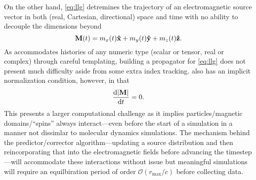 On the other hand, \cref{eq:llg} detremines the trajectory of an electromagnetic source vector in both (real, Cartesian, directional) space and time with no ability to decouple the dimensions beyond
\begin{equation}
  \vb{M}(t) = m_x(t) \vu{x} + m_y(t) \vu{y} + m_z(t) \vu{z}.
\end{equation}
As \QuEST{} accommodates histories of any numeric type (scalar or tensor, real or complex) through careful templating, building a propagator for \cref{eq:llg} does not present much difficulty aside from some extra index tracking.
 also has an implicit normalization condition, however, in that
\begin{equation}
  \dv{\abs{\vb{M}}}{t} = 0.
\end{equation}
This presents a larger computational challenge as it implies particles/magnetic domains/``spins'' always interact---even before the start of a simulation in a manner not dissimlar to molecular dynamics simulations.
The mechanism behind the predictor/corrector algorithm---updating a source distribution and then reincorporating that into the electromagnetic fields before advancing the timestep---will accommodate these interactions without issue but meaningful simulations will require an equilbiration period of order $\mathcal{O}(r_\text{max}/c)$ before collecting data.
